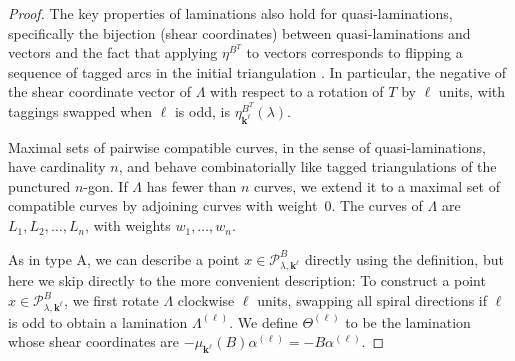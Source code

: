 \documentclass{amsart}
\theoremstyle{definition}
\theoremstyle{remark}
\numberwithin{equation}{section}
\newcommand{\0}{{\mathbf{0}}}
\newcommand{\kk}{{\boldsymbol{k}}}
\renewcommand{\P}{\mathcal{P}}
\begin{document}
\begin{proof}
The key properties of laminations also hold for quasi-laminations, specifically the bijection (shear coordinates) between quasi-laminations and vectors \cite[Theorem~4.4]{unisurface} and the fact that applying $\eta^{B^T}$ to vectors corresponds to flipping a sequence of tagged arcs in the initial triangulation \cite[Theorem~4.3]{unisurface}.
In particular, the negative of the shear coordinate vector of $\Lambda$ with respect to a rotation of $T$ by $\ell$ units, with taggings swapped when $\ell$ is odd, is $\eta^{B^T}_{\kk^\ell}(\lambda)$.

Maximal sets of pairwise compatible curves, in the sense of quasi-laminations, have cardinality $n$, and behave combinatorially like tagged triangulations of the punctured $n$-gon.
If $\Lambda$ has fewer than $n$ curves, we extend it to a maximal set of compatible curves by adjoining curves with weight~$0$.
The curves of $\Lambda$ are $L_1,L_2,\ldots,L_n$, with weights $w_1,\ldots,w_n$.

As in type A, we can describe a point $x\in\P^B_{\lambda,\kk^\ell}$ directly using the definition,  %
but here we skip directly to the more convenient description:
To construct a point $x\in\P^B_{\lambda,\kk^\ell}$, we first rotate $\Lambda$ clockwise $\ell$ units, swapping all spiral directions if $\ell$ is odd to obtain a lamination $\Lambda^{(\ell)}$.
We define $\Theta^{(\ell)}$ to be the lamination whose shear coordinates are $-\mu_{\kk^\ell}(B)\alpha^{(\ell)}=-B\alpha^{(\ell)}$.


\end{proof}
\end{document}
